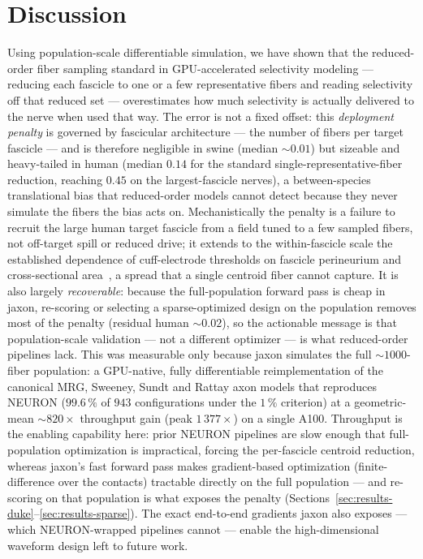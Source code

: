 \section{Discussion}
\label{sec:discussion}

Using population-scale differentiable simulation, we have shown that
the reduced-order fiber sampling standard in GPU-accelerated
selectivity modeling --- reducing each fascicle to one or a few
representative fibers and reading selectivity off that reduced set ---
overestimates how much selectivity is actually delivered to the nerve
when used that way.  The error is not a fixed offset: this \emph{deployment
penalty} is governed by fascicular architecture --- the number of fibers
per target fascicle --- and is therefore negligible in swine (median
${\sim}0.01$) but sizeable and heavy-tailed in human (median $0.14$ for the
standard single-representative-fiber reduction, reaching $0.45$ on the
largest-fascicle nerves), a between-species translational bias that
reduced-order models cannot detect because they never simulate the
fibers the bias acts on.  Mechanistically the penalty is
a failure to recruit the large human target fascicle from a field
tuned to a few sampled fibers, not off-target spill or reduced drive;
it extends to the within-fascicle scale the established dependence of
cuff-electrode thresholds on fascicle perineurium and cross-sectional
area~\cite{davis2023fascicle}, a spread that a single centroid fiber
cannot capture.
It is also largely \emph{recoverable}: because the full-population forward
pass is cheap in jaxon, re-scoring or selecting a sparse-optimized design
on the population removes most of the penalty (residual human
${\sim}0.02$), so the actionable message is that population-scale
validation --- not a different optimizer --- is what reduced-order
pipelines lack.
This was measurable only because jaxon simulates the full
${\sim}1000$-fiber population: a GPU-native, fully differentiable
reimplementation of the canonical MRG, Sweeney, Sundt and Rattay axon
models that reproduces NEURON ($99.6\,\%$ of $943$ configurations under
the $1\,\%$ criterion) at a geometric-mean $\sim\!820\times$ throughput
gain (peak $1\,377\times$) on a single A100.  Throughput is the
enabling capability here: prior NEURON pipelines are slow enough that
full-population optimization is impractical, forcing the per-fascicle
centroid reduction, whereas jaxon's fast forward pass makes
gradient-based optimization (finite-difference over the contacts)
tractable directly on the full population --- and re-scoring on that
population is what exposes the penalty
(Sections~\ref{sec:results-duke}--\ref{sec:results-sparse}).  The
exact end-to-end gradients jaxon also exposes --- which NEURON-wrapped
pipelines cannot --- enable the high-dimensional waveform design left
to future work.

